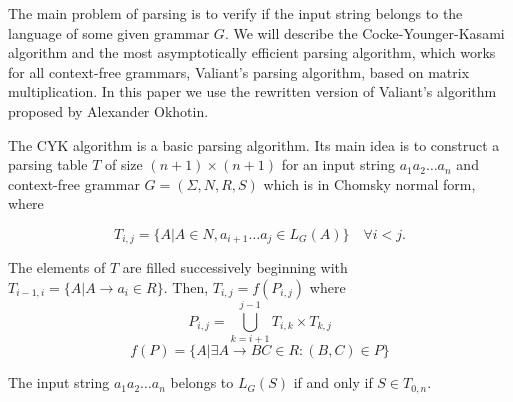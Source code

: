 The main problem of parsing is to verify if the input string belongs to the language of some given grammar $G$. We will describe the Cocke-Younger-Kasami algorithm and the most asymptotically efficient parsing algorithm, which works for all context-free grammars, Valiant's parsing algorithm, based on matrix multiplication. In this paper we use the rewritten version of Valiant's algorithm proposed by Alexander Okhotin.

The CYK algorithm is a basic parsing algorithm.
Its main idea is to construct a parsing table $T$ of size $(n + 1) \times (n + 1)$ for an input string $a_{1}a_{2} \dots a_{n}$ and context-free grammar $G = (\Sigma, N, R, S)$ which is in Chomsky normal form, where

$$T_{i, j} =  \{ A | A \in N, a_{i + 1} \dots a_{j} \in L_{G}(A)\} \quad \forall i < j.$$

The elements of $T$ are filled successively beginning with
$ T_{i - 1, i} = \{ A | A \rightarrow a_{i} \in R\}.$
Then, $ T_{i, j} = f(P_{i, j})$ where
$$ P_{i, j} = \bigcup\limits_{k = i + 1}^{j - 1} T_{i,k} \times T_{k, j}  $$
$$ f(P) = \{A | \exists A \rightarrow BC \in R : (B, C) \in P\} $$

The input string $a_{1}a_{2} \dots a_{n}$ belongs to $L_{G}(S)$ if and only if $S \in T_{0, n}$.

